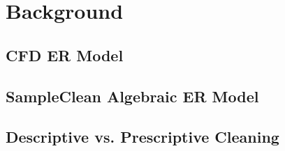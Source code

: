 \section{Background}

\subsection{CFD ER Model}

\subsection{SampleClean Algebraic ER Model}

\subsection{Descriptive vs. Prescriptive Cleaning}









